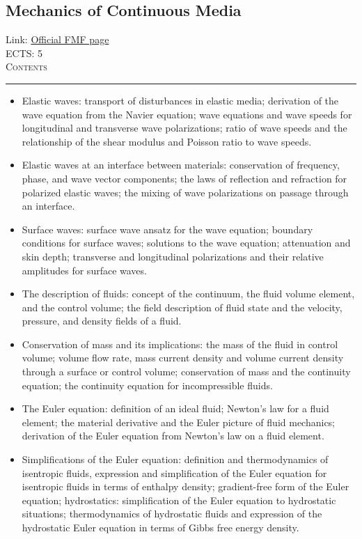 \documentclass[11pt, a4paper]{article}
\newenvironment{course}[3]{
\subsection{#1}%
Link: \href{#2}{Official FMF page}\\%
ECTS: #3%
\vspace{1ex}
\\
{\large \textsc{Contents}}\\[-0.9ex]%
\rule{\textwidth}{0.5pt}
\vspace{-3ex}
}
{}
\newenvironment{chapter}[1]{
\begin{tcolorbox}[title=#1, breakable]
}
{\end{tcolorbox}}
\begin{document}
\begin{course}{Mechanics of Continuous Media}{https://www.fmf.uni-lj.si/en/study-physics/programmes/1fiz/2020/7000777/courses/1160/}{5}
\begin{chapter}{Applications of the theory of elasticity}
\begin{itemize}
            \item Elastic waves: transport of disturbances in elastic media; derivation of the wave equation from the Navier equation; wave equations and wave speeds for longitudinal and transverse wave polarizations; ratio of wave speeds and the relationship of the shear modulus and Poisson ratio to wave speeds.

            \item Elastic waves at an interface between materials: conservation of frequency, phase, and wave vector components; the laws of reflection and refraction for polarized elastic waves; the mixing of wave polarizations on passage through an interface.

            \item Surface waves: surface wave ansatz for the wave equation; boundary conditions for surface waves; solutions to the wave equation; attenuation and skin depth; transverse and longitudinal polarizations and their relative amplitudes for surface waves.
        
        \end{itemize}
    \end{chapter}

    \begin{chapter}{Mechanics of ideal fluids}
        \begin{itemize}
        
            \item The description of fluids: concept of the continuum, the fluid volume element, and the control volume; the field description of fluid state and the velocity, pressure, and density fields of a fluid.

            \item Conservation of mass and its implications: the mass of the fluid in control volume; volume flow rate, mass current density and volume current density through a surface or control volume; conservation of mass and the continuity equation; the continuity equation for incompressible fluids.

            \item The Euler equation: definition of an ideal fluid; Newton's law for a fluid element; the material derivative and the Euler picture of fluid mechanics; derivation of the Euler equation from Newton's law on a fluid element.

            \item Simplifications of the Euler equation: definition and thermodynamics of isentropic fluids, expression and simplification of the Euler equation for isentropic fluids in terms of enthalpy density; gradient-free form of the Euler equation;
            hydrostatics: simplification of the Euler equation to hydrostatic situations; thermodynamics of hydrostatic fluids and expression of the hydrostatic Euler equation in terms of Gibbs free energy density.


\end{itemize}
\end{chapter}
\end{course}
\end{document}
